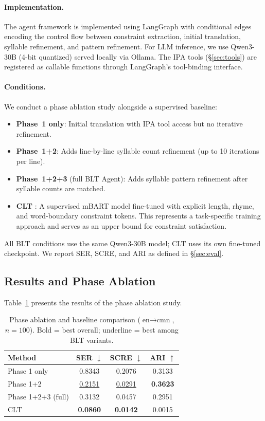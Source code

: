 \documentclass[11pt]{article}
\begin{document}
\paragraph{Implementation.}
The agent framework is implemented using LangGraph with conditional edges encoding the control flow between constraint extraction, initial translation, syllable refinement, and pattern refinement.
For LLM inference, we use Qwen3-30B (4-bit quantized) served locally via Ollama.
The IPA tools (\S\ref{sec:tools}) are registered as callable functions through LangGraph's tool-binding interface.

\paragraph{Conditions.}
We conduct a phase ablation study alongside a supervised baseline:
\begin{itemize}
    \item \textbf{Phase~1 only}: Initial translation with IPA tool access but no iterative refinement.
    \item \textbf{Phase~1+2}: Adds line-by-line syllable count refinement (up to 10 iterations per line).
    \item \textbf{Phase~1+2+3} (full BLT Agent): Adds syllable pattern refinement after syllable counts are matched.
    \item \textbf{CLT} \citep{ou-etal-2023-songs}: A supervised mBART model fine-tuned with explicit length, rhyme, and word-boundary constraint tokens. This represents a task-specific training approach and serves as an upper bound for constraint satisfaction.
\end{itemize}
All BLT conditions use the same Qwen3-30B model; CLT uses its own fine-tuned checkpoint.
We report SER, SCRE, and ARI as defined in \S\ref{sec:eval}.

\subsection{Results and Phase Ablation}

Table~\ref{tab:ablation} presents the results of the phase ablation study.

\begin{table}[t]
\centering
\small
\begin{tabular}{@{}lccc@{}}
\toprule
\textbf{Method} & \textbf{SER} $\downarrow$ & \textbf{SCRE} $\downarrow$ & \textbf{ARI} $\uparrow$ \\
\midrule
Phase 1 only         & 0.8343 & 0.2076 & 0.3133 \\
Phase 1+2            & \underline{0.2151} & \underline{0.0291} & \textbf{0.3623} \\
Phase 1+2+3 (full)   & 0.3132 & 0.0457 & 0.2951 \\
\midrule
CLT \citep{ou-etal-2023-songs} & \textbf{0.0860} & \textbf{0.0142} & 0.0015 \\
\bottomrule
\end{tabular}
\caption{Phase ablation and baseline comparison ($\text{en} \rightarrow \text{cmn}$, $n{=}100$). Bold = best overall; underline = best among BLT variants.}
\label{tab:ablation}
\end{table}
\end{document}
